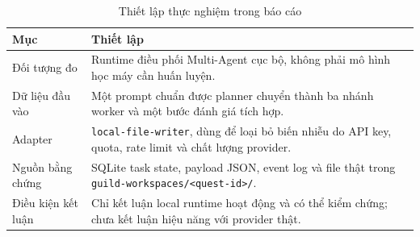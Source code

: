 \documentclass[12pt,a4paper]{article}
\begin{document}
\begin{table}[H]
\centering
\caption{Thiết lập thực nghiệm trong báo cáo}
\begin{tabular}{P{0.28\textwidth}P{0.62\textwidth}}
\toprule
\textbf{Mục} & \textbf{Thiết lập} \\
\midrule
Đối tượng đo & Runtime điều phối Multi-Agent cục bộ, không phải mô hình học máy cần huấn luyện. \\
Dữ liệu đầu vào & Một prompt chuẩn được planner chuyển thành ba nhánh worker và một bước đánh giá tích hợp. \\
Adapter & \texttt{local-file-writer}, dùng để loại bỏ biến nhiễu do API key, quota, rate limit và chất lượng provider. \\
Nguồn bằng chứng & SQLite task state, payload JSON, event log và file thật trong \texttt{guild-workspaces/<quest-id>/}. \\
Điều kiện kết luận & Chỉ kết luận local runtime hoạt động và có thể kiểm chứng; chưa kết luận hiệu năng với provider thật. \\
\bottomrule
\end{tabular}
\end{table}
\end{document}
